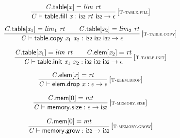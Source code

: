 $$
\begin{array}{@{}c@{}}\displaystyle
\frac{
{\mathit{C}}.\mathsf{table}{}[{\mathit{x}}] = {\mathit{lim}}~{\mathit{rt}}
}{
{\mathit{C}} \vdash \mathsf{table.fill}~{\mathit{x}} : \mathsf{i{\scriptstyle32}}~{\mathit{rt}}~\mathsf{i{\scriptstyle32}} \rightarrow \epsilon
} \, {[\textsc{\scriptsize T{-}table.fill}]}
\qquad
\end{array}
$$

$$
\begin{array}{@{}c@{}}\displaystyle
\frac{
{\mathit{C}}.\mathsf{table}{}[{\mathit{x}}_{{1}}] = {\mathit{lim}}_{{1}}~{\mathit{rt}}
 \qquad
{\mathit{C}}.\mathsf{table}{}[{\mathit{x}}_{{2}}] = {\mathit{lim}}_{{2}}~{\mathit{rt}}
}{
{\mathit{C}} \vdash \mathsf{table.copy}~{\mathit{x}}_{{1}}~{\mathit{x}}_{{2}} : \mathsf{i{\scriptstyle32}}~\mathsf{i{\scriptstyle32}}~\mathsf{i{\scriptstyle32}} \rightarrow \epsilon
} \, {[\textsc{\scriptsize T{-}table.copy}]}
\qquad
\end{array}
$$

$$
\begin{array}{@{}c@{}}\displaystyle
\frac{
{\mathit{C}}.\mathsf{table}{}[{\mathit{x}}_{{1}}] = {\mathit{lim}}~{\mathit{rt}}
 \qquad
{\mathit{C}}.\mathsf{elem}{}[{\mathit{x}}_{{2}}] = {\mathit{rt}}
}{
{\mathit{C}} \vdash \mathsf{table.init}~{\mathit{x}}_{{1}}~{\mathit{x}}_{{2}} : \mathsf{i{\scriptstyle32}}~\mathsf{i{\scriptstyle32}}~\mathsf{i{\scriptstyle32}} \rightarrow \epsilon
} \, {[\textsc{\scriptsize T{-}table.init}]}
\qquad
\end{array}
$$

$$
\begin{array}{@{}c@{}}\displaystyle
\frac{
{\mathit{C}}.\mathsf{elem}{}[{\mathit{x}}] = {\mathit{rt}}
}{
{\mathit{C}} \vdash \mathsf{elem.drop}~{\mathit{x}} : \epsilon \rightarrow \epsilon
} \, {[\textsc{\scriptsize T{-}elem.drop}]}
\qquad
\end{array}
$$

\vspace{1ex}

$$
\begin{array}{@{}c@{}}\displaystyle
\frac{
{\mathit{C}}.\mathsf{mem}{}[0] = {\mathit{mt}}
}{
{\mathit{C}} \vdash \mathsf{memory.size} : \epsilon \rightarrow \mathsf{i{\scriptstyle32}}
} \, {[\textsc{\scriptsize T{-}memory.size}]}
\qquad
\end{array}
$$

$$
\begin{array}{@{}c@{}}\displaystyle
\frac{
{\mathit{C}}.\mathsf{mem}{}[0] = {\mathit{mt}}
}{
{\mathit{C}} \vdash \mathsf{memory.grow} : \mathsf{i{\scriptstyle32}} \rightarrow \mathsf{i{\scriptstyle32}}
} \, {[\textsc{\scriptsize T{-}memory.grow}]}
\qquad
\end{array}
$$

